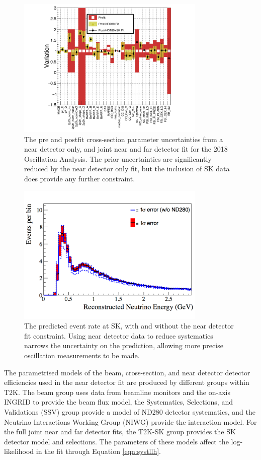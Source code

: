 \begin{figure}[!htbp]
\centering
\includegraphics*[width=0.8\textwidth,clip]{figs/NDSKConstraint}
\caption{The pre and postfit cross-section parameter uncertainties from a near detector only, and joint near and far detector fit for the 2018 Oscillation Analysis. The prior uncertainties are significantly reduced by the near detector only fit, but the inclusion of SK data does provide any further constraint.}\label{fig:ndskconstraint}
\end{figure}

\begin{figure}[!htbp]
\centering
\includegraphics*[width=0.8\textwidth,clip]{figs/NDConstraint}
\caption{The predicted event rate at SK, with and without the near detector fit constraint. Using near detector data to reduce systematics narrows the uncertainty on the prediction, allowing more precise oscillation measurements to be made. }\label{fig:ndconstraint}
\end{figure}

The parametrised models of the beam, cross-section, and near detector detector efficiencies used in the near detector fit are produced by different groups within T2K. The beam group uses data from beamline monitors and the on-axis INGRID to provide the beam flux model, the Systematics, Selections, and Validations (SSV) group provide a model of ND280 detector systematics, and the Neutrino Interactions Working Group (NIWG) provide the interaction model. For the full joint near and far detector fits, the T2K-SK group provides the SK detector model and selections. The parameters of these models affect the log-likelihood in the fit through Equation \ref{eqn:systllh}.

